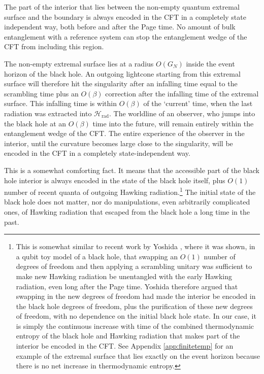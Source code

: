 \documentclass[12pt]{article}
\begin{document}
The part of the interior that lies between the non-empty quantum extremal surface and the boundary is always encoded in the CFT in a completely state independent way, both before and after the Page time. No amount of bulk entanglement with a reference system can stop the entanglement wedge of the CFT from including this region.

The non-empty extremal surface lies at a radius $O(G_N)$ inside the event horizon of the black hole. An outgoing lightcone starting from this extremal surface will therefore hit the singularity after an infalling time equal to the scrambling time plus an $O(\beta)$ correction after the infalling time of the extremal surface. This infalling time is within $O(\beta)$ of the `current' time, when the last radiation was extracted into $\mathcal{H}_\text{rad}$. The worldline of an observer, who jumps into the black hole at an $O(\beta)$ time into the future,  will remain entirely within the entanglement wedge of the CFT. The entire experience of the observer in the interior, until the curvature becomes large close to the singularity, will be encoded in the CFT in a completely state-independent way.

This is a somewhat comforting fact. It means that the accessible part of the black hole interior is always encoded in the state of the black hole itself, plus $O(1)$ number of recent quanta of outgoing Hawking radiation.\footnote{This is somewhat similar to recent work by Yoshida \cite{yoshida2019firewalls}, where it was shown,  in a qubit toy model of a black hole, that swapping an $O(1)$ number of degrees of freedom and then applying a scrambling unitary was sufficient to make new Hawking radiation be unentangled with the early Hawking radiation, even long after the Page time. Yoshida therefore argued that swapping in the new degrees of freedom had made the interior be encoded in the black hole degrees of freedom, plus the purification of these new degrees of freedom, with no dependence on the initial black hole state. In our case, it is simply the continuous increase with time of the combined thermodynamic entropy of the black hole and Hawking radiation that makes part of the interior be encoded in the CFT. See Appendix \ref{app:finitetemp} for an example of the extremal surface that lies exactly on the event horizon because there is no net increase in thermodynamic entropy.} The initial state of the black hole does not matter, nor do manipulations, even arbitrarily complicated ones, of Hawking radiation that escaped from the black hole a long time in the past.
\end{document}
